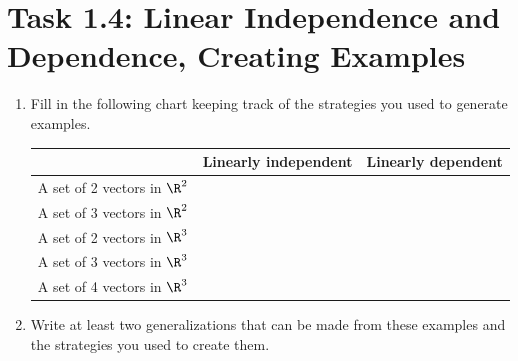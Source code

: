 \documentclass{problemset}
\begin{document}
\newpage
\pagestyle{iola}
\section*{Task 1.4: Linear Independence and Dependence, Creating Examples}



\begin{enumerate}
	\item Fill in the following chart keeping track of the strategies you used to generate
examples.

\vspace{2mm}

\begin{center}
\begin{tabular}{|c|c|c|}
	\hline
	&Linearly independent & Linearly dependent \\
	\hline
	A set of 2 vectors in $\R^2$ &&\\
	\hline
	A set of 3 vectors in $\R^2$ &&\\
	\hline
	A set of 2 vectors in $\R^3$ &&\\
	\hline
	A set of 3 vectors in $\R^3$ &&\\
	\hline
	A set of 4 vectors in $\R^3$ &&\\
	\hline
\end{tabular}
\end{center}
	
		\item Write at least two generalizations that can
			be made from these examples and the strategies you
			used to create them.

\end{enumerate}


\newpage
\pagestyle{siefken}
\end{document}
